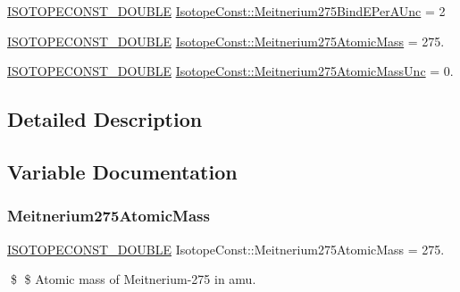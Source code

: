 \begin{DoxyCompactItemize}
\mbox{\hyperlink{group___isotope_const-_macros_ga8f45a7272ce02c0b4c65c44636ed719a}{I\+S\+O\+T\+O\+P\+E\+C\+O\+N\+S\+T\+\_\+\+D\+O\+U\+B\+LE}} \mbox{\hyperlink{group___isotope_const-_meitnerium-_mt275_ga6c57c28cc959f1e8ee5b628fa0c7a74e}{Isotope\+Const\+::\+Meitnerium275\+Bind\+E\+Per\+A\+Unc}} = 2
\item 
\mbox{\hyperlink{group___isotope_const-_macros_ga8f45a7272ce02c0b4c65c44636ed719a}{I\+S\+O\+T\+O\+P\+E\+C\+O\+N\+S\+T\+\_\+\+D\+O\+U\+B\+LE}} \mbox{\hyperlink{group___isotope_const-_meitnerium-_mt275_gad94920cd7acff180862f6eb00a32a896}{Isotope\+Const\+::\+Meitnerium275\+Atomic\+Mass}} = 275.
\item 
\mbox{\hyperlink{group___isotope_const-_macros_ga8f45a7272ce02c0b4c65c44636ed719a}{I\+S\+O\+T\+O\+P\+E\+C\+O\+N\+S\+T\+\_\+\+D\+O\+U\+B\+LE}} \mbox{\hyperlink{group___isotope_const-_meitnerium-_mt275_ga73e1ca22919eabcff7a63587d4dae9c5}{Isotope\+Const\+::\+Meitnerium275\+Atomic\+Mass\+Unc}} = 0.
\end{DoxyCompactItemize}


\subsection{Detailed Description}


\subsection{Variable Documentation}
\mbox{\label{group___isotope_const-_meitnerium-_mt275_gad94920cd7acff180862f6eb00a32a896}} 
\subsubsection{\texorpdfstring{Meitnerium275\+Atomic\+Mass}{Meitnerium275AtomicMass}}
{\footnotesize\ttfamily \mbox{\hyperlink{group___isotope_const-_macros_ga8f45a7272ce02c0b4c65c44636ed719a}{I\+S\+O\+T\+O\+P\+E\+C\+O\+N\+S\+T\+\_\+\+D\+O\+U\+B\+LE}} Isotope\+Const\+::\+Meitnerium275\+Atomic\+Mass = 275.}

\$ \$ Atomic mass of Meitnerium-\/275 in amu. \mbox{\label{group___isotope_const-_meitnerium-_mt275_ga73e1ca22919eabcff7a63587d4dae9c5}} 

